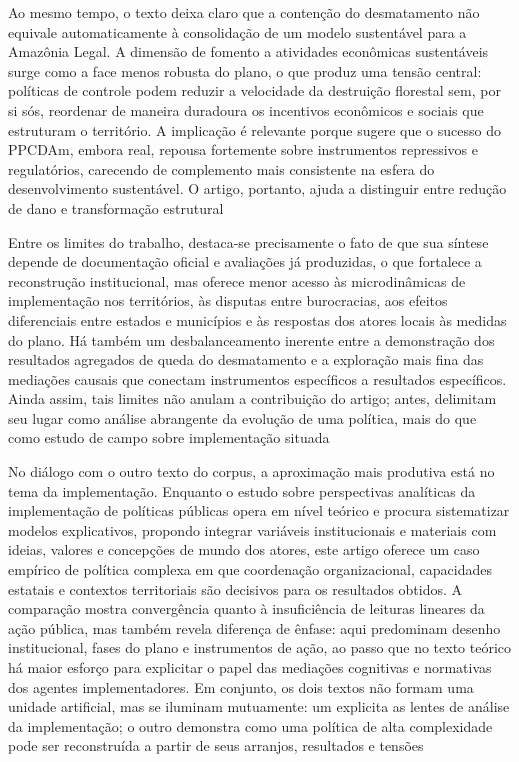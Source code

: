 \documentclass[12pt,a4paper]{article}
\begin{document}
Ao mesmo tempo, o texto deixa claro que a contenção do desmatamento não equivale automaticamente à consolidação de um modelo sustentável para a Amazônia Legal. A dimensão de fomento a atividades econômicas sustentáveis surge como a face menos robusta do plano, o que produz uma tensão central: políticas de controle podem reduzir a velocidade da destruição florestal sem, por si sós, reordenar de maneira duradoura os incentivos econômicos e sociais que estruturam o território. A implicação é relevante porque sugere que o sucesso do PPCDAm, embora real, repousa fortemente sobre instrumentos repressivos e regulatórios, carecendo de complemento mais consistente na esfera do desenvolvimento sustentável. O artigo, portanto, ajuda a distinguir entre redução de dano e transformação estrutural \parencite{mello2017_evolucao_plano}

Entre os limites do trabalho, destaca-se precisamente o fato de que sua síntese depende de documentação oficial e avaliações já produzidas, o que fortalece a reconstrução institucional, mas oferece menor acesso às microdinâmicas de implementação nos territórios, às disputas entre burocracias, aos efeitos diferenciais entre estados e municípios e às respostas dos atores locais às medidas do plano. Há também um desbalanceamento inerente entre a demonstração dos resultados agregados de queda do desmatamento e a exploração mais fina das mediações causais que conectam instrumentos específicos a resultados específicos. Ainda assim, tais limites não anulam a contribuição do artigo; antes, delimitam seu lugar como análise abrangente da evolução de uma política, mais do que como estudo de campo sobre implementação situada \parencite{mello2017_evolucao_plano}

No diálogo com o outro texto do corpus, a aproximação mais produtiva está no tema da implementação. Enquanto o estudo sobre perspectivas analíticas da implementação de políticas públicas opera em nível teórico e procura sistematizar modelos explicativos, propondo integrar variáveis institucionais e materiais com ideias, valores e concepções de mundo dos atores, este artigo oferece um caso empírico de política complexa em que coordenação organizacional, capacidades estatais e contextos territoriais são decisivos para os resultados obtidos. A comparação mostra convergência quanto à insuficiência de leituras lineares da ação pública, mas também revela diferença de ênfase: aqui predominam desenho institucional, fases do plano e instrumentos de ação, ao passo que no texto teórico há maior esforço para explicitar o papel das mediações cognitivas e normativas dos agentes implementadores. Em conjunto, os dois textos não formam uma unidade artificial, mas se iluminam mutuamente: um explicita as lentes de análise da implementação; o outro demonstra como uma política de alta complexidade pode ser reconstruída a partir de seus arranjos, resultados e tensões \parencite{ascenzi2013_implementacao_politicas,mello2017_evolucao_plano}
\end{document}
